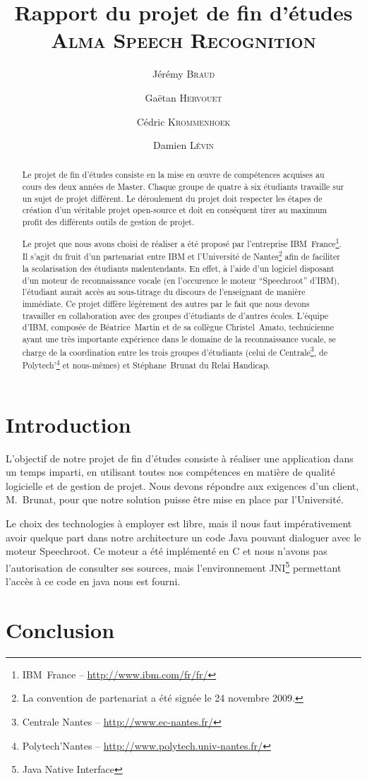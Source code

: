 \documentclass[a4paper,11pt]{report}
\title{Rapport du projet de fin d'études\\
	\huge{\textsc{Alma Speech Recognition}}}
\author{Jérémy \textsc{Braud} \and Gaëtan \textsc{Hervouet} \and Cédric \textsc{Krommenhoek} \and Damien \textsc{Lévin}}
\begin{document}
\maketitle

\begin{abstract}
Le projet de fin d'études consiste en la mise en \oe{}uvre de compétences acquises au cours des deux années de Master.
Chaque groupe de quatre à six étudiants travaille sur un sujet de projet différent.
Le déroulement du projet doit respecter les étapes de création d'un véritable projet open-source et doit en conséquent tirer au maximum profit des différents outils de gestion de projet.

Le projet que nous avons choisi de réaliser a été proposé par l'entreprise IBM~France\footnote{IBM~France -- \url{http://www.ibm.com/fr/fr/}}.
Il s'agit du fruit d'un partenariat entre IBM et l'Université de Nantes\footnote{La convention de partenariat a été signée le 24 novembre 2009.} afin de faciliter la scolarisation des étudiants malentendants.
En effet, à l'aide d'un logiciel disposant d'un moteur de reconnaissance vocale (en l'occurence le moteur ``Speechroot'' d'IBM), l'étudiant aurait accès au sous-titrage du discours de l'enseignant de manière immédiate.
Ce projet diffère légèrement des autres par le fait que nous devons travailler en collaboration avec des groupes d'étudiants de d'autres écoles.
L'équipe d'IBM, composée de Béatrice~Martin et de sa collègue Christel~Amato, technicienne ayant une très importante expérience dans le domaine de la reconnaissance vocale, se charge de la coordination entre les trois groupes d'étudiants (celui de Centrale\footnote{Centrale Nantes -- \url{http://www.ec-nantes.fr/}}, de Polytech'\footnote{Polytech'Nantes -- \url{http://www.polytech.univ-nantes.fr/}} et nous-mêmes) et Stéphane~Brunat du Relai Handicap.
\end{abstract}

\tableofcontents


\chapter*{Introduction}
L'objectif de notre projet de fin d'études consiste à réaliser une application dans un temps imparti, en utilisant toutes nos compétences en matière de qualité logicielle et de gestion de projet.
Nous devons répondre aux exigences d'un client, M.~Brunat, pour que notre solution puisse être mise en place par l'Université.

Le choix des technologies à employer est libre, mais il nous faut im\-pé\-ra\-ti\-ve\-ment avoir quelque part dans notre architecture un code Java pouvant dialoguer avec le moteur Speechroot.
Ce moteur a été implémenté en C et nous n'avons pas l'autorisation de consulter ses sources, mais l'environnement JNI\footnote{Java Native Interface} permettant l'accès à ce code en java nous est fourni.







\chapter*{Conclusion}




\end{document}
